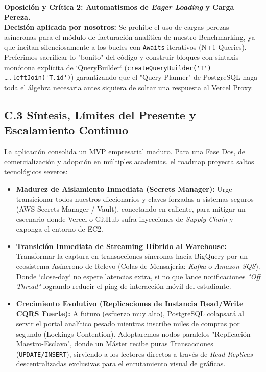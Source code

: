 \documentclass[12pt,a4paper]{article}
\begin{document}
\textbf{Oposición y Crítica 2: Automatismos de \textit{Eager Loading} y Carga Pereza.}\\
\textbf{Decisión aplicada por nosotros:} Se prohíbe el uso de cargas perezas asíncronas para el módulo de facturación analítica de nuestro Benchmarking, ya que incitan silenciosamente a los bucles con \texttt{Awaits} iterativos (N+1 Queries). Preferimos sacrificar lo "bonito" del código y construir bloques con sintaxis monótona explícita de `QueryBuilder` (\verb|createQueryBuilder('T')| \dots \verb|.leftJoin('T.id')|) garantizando que el "Query Planner" de PostgreSQL haga toda el álgebra necesaria antes siquiera de soltar una respuesta al Vercel Proxy.

\subsection{C.3 Síntesis, Límites del Presente y Escalamiento Continuo}

La aplicación consolida un MVP empresarial maduro. Para una Fase Dos, de comercialización y adopción en múltiples academias, el roadmap proyecta saltos tecnológicos severos:

\begin{itemize}
    \item \textbf{Madurez de Aislamiento Inmediata (Secrets Manager):} Urge transicionar todos nuestros diccionarios y claves forzadas a sistemas seguros (AWS Secrets Manager / Vault), conectando en caliente, para mitigar un escenario donde Vercel o GitHub sufra inyecciones de \textit{Supply Chain} y exponga el entorno de EC2.
    
    \item \textbf{Transición Inmediata de Streaming Híbrido al Warehouse:} Transformar la captura en transacciones síncronas hacia BigQuery por un ecosistema Asíncrono de Relevo (Colas de Mensajería: \textit{Kafka} o \textit{Amazon SQS}). Donde `close-day` no espere latencias extra, si no que lance notificaciones \textit{"Off Thread"} logrando reducir el ping de interacción móvil del estudiante.
    
    \item \textbf{Crecimiento Evolutivo (Replicaciones de Instancia Read/Write CQRS Fuerte):} A futuro (esfuerzo muy alto), PostgreSQL colapsará al servir el portal analítico pesado mientras inscribe miles de compras por segundo (Lockings Contention). Adoptaremos nodos paralelos "Replicación Maestro-Esclavo", donde un Máster recibe puras Transacciones (\texttt{UPDATE/INSERT}), sirviendo a los lectores directos a través de \textit{Read Replicas} descentralizadas exclusivas para el enrutamiento visual de gráficas.
\end{itemize}
\end{document}
